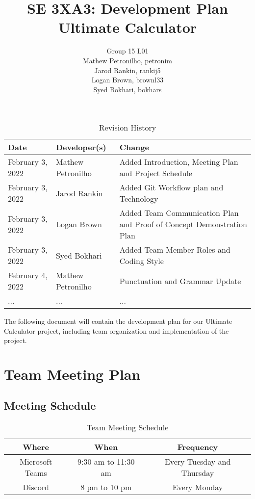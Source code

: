 \documentclass{article}
\title{SE 3XA3: Development Plan\\Ultimate Calculator}
\author{Group 15 L01
		\\ Mathew Petronilho, petronim
		\\ Jarod Rankin, rankij5
		\\ Logan Brown, brownl33
		\\ Syed Bokhari, bokhars
}
\date{}
\begin{document}
\begin{table}[hp]
\caption{Revision History} \label{TblRevisionHistory}
\begin{tabularx}{\textwidth}{llX}
\toprule
\textbf{Date} & \textbf{Developer(s)} & \textbf{Change}\\
\midrule
February 3, 2022 & Mathew Petronilho & Added Introduction, Meeting Plan and Project Schedule\\
February 3, 2022 & Jarod Rankin & Added Git Workflow plan and Technology\\
February 3, 2022 & Logan Brown & Added Team Communication Plan and Proof of Concept Demonstration Plan\\
February 3, 2022 & Syed Bokhari & Added Team Member Roles and Coding Style\\
February 4, 2022 & Mathew Petronilho & Punctuation and Grammar Update \\
... & ... & ...\\
\bottomrule
\end{tabularx}
\end{table}

\newpage

\maketitle

The following document will contain the development plan for our Ultimate Calculator project, including team organization and implementation of the project.

\section{Team Meeting Plan}
\subsection{Meeting Schedule}
\begin{table}[hbt!]
\begin{tabular}{|c|c|c|}
\hline
Where           & When                & Frequency                  \\ \hline
Microsoft Teams & 9:30 am to 11:30 am & Every Tuesday and Thursday \\
Discord         & 8 pm to 10 pm       & Every Monday               \\ \hline
\end{tabular}
\caption{Team Meeting Schedule}
\label{tab:my-table}
\end{table}
\end{document}
